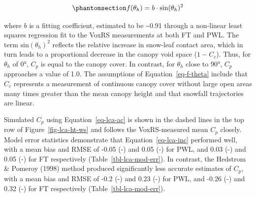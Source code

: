 \documentclass[
  letterpaper,
]{tex/uofsthesis-cs}
\begin{document}
\begin{equation}\phantomsection\label{eq-f-theta}{
f(\theta_h) = b \cdot\text{sin}(\theta_h)^2
}\end{equation}

where \(b\) is a fitting coefficient, estimated to be
\textasciitilde0.91 through a non-linear least squares regression fit to
the VoxRS measurements at both FT and PWL. The term
\(\text{sin}(\theta_h)^2\) reflects the relative increase in snow-leaf
contact area, which in turn leads to a proportional decrease in the
canopy void space (\(1-C_c\)). Thus, for \(\theta_h\) of 0°, \(C_p\) is
equal to the canopy cover. In contrast, for \(\theta_h\) close to 90°,
\(C_p\) approaches a value of 1.0. The assumptions of
Equation~\ref{eq-f-theta} include that \(C_c\) represents a measurement
of continuous canopy cover without large open areas many times greater
than the mean canopy height and that snowfall trajectories are linear.

Simulated \(C_p\) using Equation~\ref{eq-lca-ac} is shown in the dashed
lines in the top row of Figure~\ref{fig-lca-ht-ws} and follows the
VoxRS-measured mean \(C_p\) closely. Model error statistics demonstrate
that Equation~\ref{eq-lca-inc} performed well, with a mean bias and RMSE
of -0.05 (-) and 0.05 (-) for PWL, and 0.03 (-) and 0.05 (-) for FT
respectively (Table~\ref{tbl-lca-mod-err}). In contrast, the Hedstrom \&
Pomeroy (1998) method produced significantly less accurate estimates of
\(C_p\), with a mean bias and RMSE of -0.2 (-) and 0.23 (-) for PWL, and
-0.26 (-) and 0.32 (-) for FT respectively
(Table~\ref{tbl-lca-mod-err}).

\pagebreak
\end{document}
